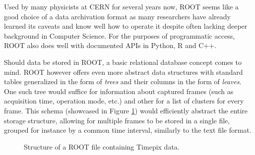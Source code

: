 
Used by many physicists at CERN for several years now, ROOT seems like a good choice of a data archivation format as many researchers have already learned its caveats and know well how to operate it despite often lacking deeper background in Computer Science. For the purposes of programmatic access, ROOT also does well with documented APIs in Python, R and C++.

Should data be stored in ROOT, a basic relational database concept comes to mind. ROOT however offers even more abstract data structures with standard tables generalized in the form of \textit{trees} and their columns in the form of \textit{leaves}. One such tree would suffice for information about captured frames (such as acquisition time, operation mode, etc.) and other for a list of clusters for every frame. This schema (showcased in Figure \ref{fig:root-trees}) would efficiently abstract the entire storage structure, allowing for multiple frames to be stored in a single file, grouped for instance by a common time interval, similarly to the text file format.

\begin{figure}[t]
\begin{center}


\caption{Structure of a ROOT file containing Timepix data.}
\label{fig:root-trees}
\end{center}
\end{figure}

